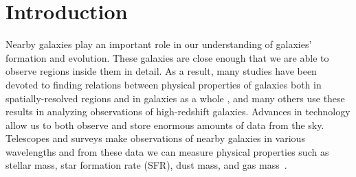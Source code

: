 \section{Introduction}


Nearby galaxies play an important role in our understanding of galaxies' formation and evolution.
These galaxies are close enough that we are able to observe regions inside them in detail.
As a result, many studies have been devoted to finding relations between physical properties of galaxies both in spatially-resolved regions and in galaxies as a whole%
, and many others use these results in analyzing observations of high-redshift galaxies. %
Advances in technology allow us to both observe and store enormous amounts of data from the sky.%
Telescopes and surveys make observations of nearby galaxies in various wavelengths and from these data we can measure physical properties such as stellar mass, star formation rate (SFR), dust mass, and gas mass~\citep[e.g.[]{Calzetti07,Dale09,Eskew12}.

